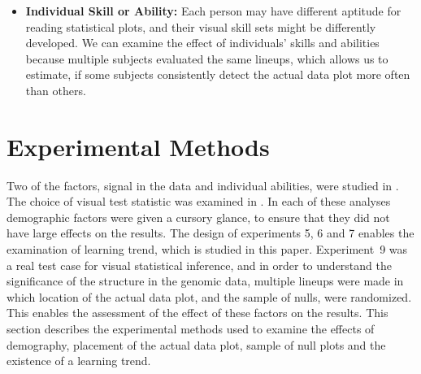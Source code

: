\documentclass[10pt]{article}\usepackage[]{graphicx}\usepackage[]{color}
\begin{document}
\begin{itemize}
\item{\bf Individual Skill or Ability:} Each person may have different  aptitude for reading statistical plots, and their visual skill sets might be differently developed.  We can examine the effect of individuals' skills and abilities because multiple subjects evaluated the same lineups, which allows us to estimate, if some subjects consistently detect the actual data plot more often than others.  
\end{itemize}

\section{Experimental Methods}\label{sec:exp_design}


Two of the factors, signal in the data and individual abilities, were studied in \cite{majumder:2013}. The choice of visual test statistic was examined in \cite{heike:2012}. In each of these analyses demographic factors were given a cursory glance, to ensure that they did not have large effects on the results. The design of experiments 5, 6 and 7 enables the examination of learning trend, which is studied in this paper. Experiment~9 was a real test case for visual statistical inference, and in order to understand the significance of the structure in the genomic data, multiple lineups were made in which location of the actual data plot, and the sample of nulls, were randomized. This enables the assessment of the effect of these factors on the results. This section describes the experimental methods used to examine the effects of demography, placement of the actual data plot, sample of null plots and the existence of a learning trend. 

\end{document}
